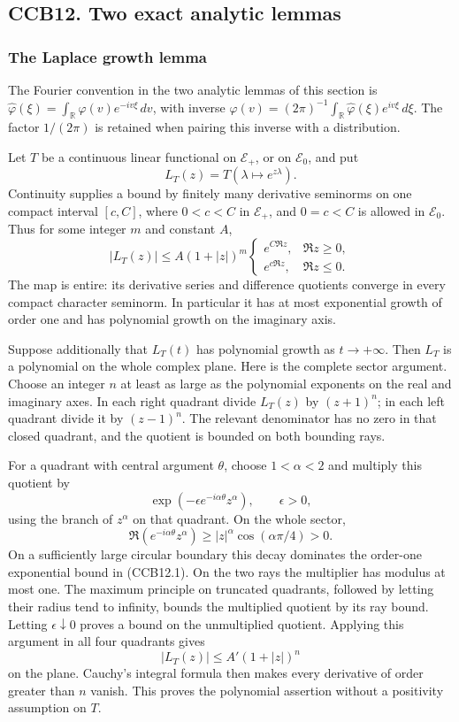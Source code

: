 \subsection{CCB12. Two exact analytic
lemmas}\label{ccb12.-two-exact-analytic-lemmas}

\subsubsection{The Laplace growth lemma}\label{the-laplace-growth-lemma}

The Fourier convention in the two analytic lemmas of this section is
\(\widehat\varphi(\xi)=\int_{\mathbb R}\varphi(v)e^{-iv\xi}\,dv\), with
inverse
\(\varphi(v)=(2\pi)^{-1}\int_{\mathbb R}\widehat\varphi(\xi)e^{iv\xi}\,d\xi\).
The factor \(1/(2\pi)\) is retained when pairing this inverse with a
distribution.

Let \(T\) be a continuous linear functional on \(\mathscr E_+\), or on
\(\mathscr E_0\), and put \[
L_T(z)=T(\lambda\longmapsto e^{z\lambda}).
\] Continuity supplies a bound by finitely many derivative seminorms on
one compact interval \([c,C]\), where \(0<c<C\) in \(\mathscr E_+\), and
\(0=c<C\) is allowed in \(\mathscr E_0\). Thus for some integer \(m\)
and constant \(A\), \[
|L_T(z)|\le A(1+|z|)^m
\begin{cases}
e^{C\Re z},&\Re z\ge0,\\
e^{c\Re z},&\Re z\le0.
\end{cases}
\tag{CCB12.1}
\] The map is entire: its derivative series and difference quotients
converge in every compact character seminorm. In particular it has at
most exponential growth of order one and has polynomial growth on the
imaginary axis.

Suppose additionally that \(L_T(t)\) has polynomial growth as
\(t\to+\infty\). Then \(L_T\) is a polynomial on the whole complex
plane. Here is the complete sector argument. Choose an integer \(n\) at
least as large as the polynomial exponents on the real and imaginary
axes. In each right quadrant divide \(L_T(z)\) by \((z+1)^n\); in each
left quadrant divide it by \((z-1)^n\). The relevant denominator has no
zero in that closed quadrant, and the quotient is bounded on both
bounding rays.

For a quadrant with central argument \(\theta\), choose \(1<\alpha<2\)
and multiply this quotient by \[
\exp(-\epsilon e^{-i\alpha\theta}z^\alpha),\qquad\epsilon>0,
\] using the branch of \(z^\alpha\) on that quadrant. On the whole
sector, \[
\Re(e^{-i\alpha\theta}z^\alpha)
\ge |z|^\alpha\cos(\alpha\pi/4)>0.
\] On a sufficiently large circular boundary this decay dominates the
order-one exponential bound in (CCB12.1). On the two rays the multiplier
has modulus at most one. The maximum principle on truncated quadrants,
followed by letting their radius tend to infinity, bounds the multiplied
quotient by its ray bound. Letting \(\epsilon\downarrow0\) proves a
bound on the unmultiplied quotient. Applying this argument in all four
quadrants gives \[
|L_T(z)|\le A'(1+|z|)^n
\] on the plane. Cauchy's integral formula then makes every derivative
of order greater than \(n\) vanish. This proves the polynomial assertion
without a positivity assumption on \(T\).

